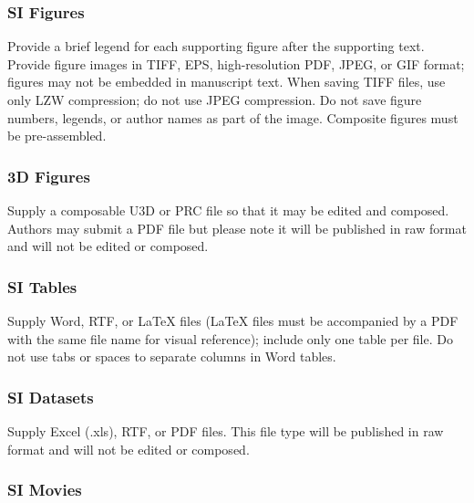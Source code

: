 \documentclass[9pt,twocolumn,twoside,]{pnas-new}
\begin{document}
\hypertarget{si-figures}{%
\subsubsection*{SI Figures}\label{si-figures}}

Provide a brief legend for each supporting figure after the supporting
text. Provide figure images in TIFF, EPS, high-resolution PDF, JPEG, or
GIF format; figures may not be embedded in manuscript text. When saving
TIFF files, use only LZW compression; do not use JPEG compression. Do
not save figure numbers, legends, or author names as part of the image.
Composite figures must be pre-assembled.

\hypertarget{d-figures}{%
\subsubsection*{3D Figures}\label{d-figures}}

Supply a composable U3D or PRC file so that it may be edited and
composed. Authors may submit a PDF file but please note it will be
published in raw format and will not be edited or composed.

\hypertarget{si-tables}{%
\subsubsection*{SI Tables}\label{si-tables}}

Supply Word, RTF, or LaTeX files (LaTeX files must be accompanied by a
PDF with the same file name for visual reference); include only one
table per file. Do not use tabs or spaces to separate columns in Word
tables.

\hypertarget{si-datasets}{%
\subsubsection*{SI Datasets}\label{si-datasets}}

Supply Excel (.xls), RTF, or PDF files. This file type will be published
in raw format and will not be edited or composed.

\hypertarget{si-movies}{%
\subsubsection*{SI Movies}\label{si-movies}}
\end{document}

